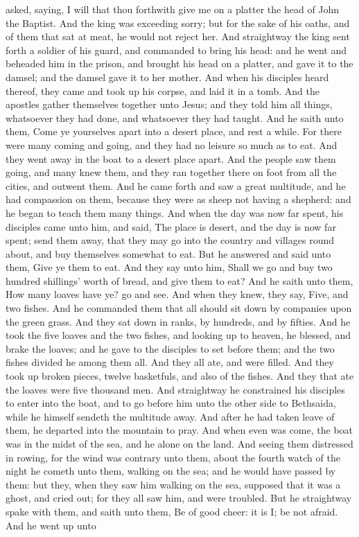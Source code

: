 asked, saying, I will that thou forthwith give me on a platter the head of John the Baptist. And the king was exceeding sorry; but for the sake of his oaths, and of them that sat at meat, he would not reject her. And straightway the king sent forth a soldier of his guard, and commanded to bring his head: and he went and beheaded him in the prison, and brought his head on a platter, and gave it to the damsel; and the damsel gave it to her mother. And when his disciples heard thereof, they came and took up his corpse, and laid it in a tomb.  And the apostles gather themselves together unto Jesus; and they told him all things, whatsoever they had done, and whatsoever they had taught. And he saith unto them, Come ye yourselves apart into a desert place, and rest a while. For there were many coming and going, and they had no leisure so much as to eat. And they went away in the boat to a desert place apart. And the people saw them going, and many knew them, and they ran together there on foot from all the cities, and outwent them. And he came forth and saw a great multitude, and he had compassion on them, because they were as sheep not having a shepherd: and he began to teach them many things. And when the day was now far spent, his disciples came unto him, and said, The place is desert, and the day is now far spent; send them away, that they may go into the country and villages round about, and buy themselves somewhat to eat. But he answered and said unto them, Give ye them to eat. And they say unto him, Shall we go and buy two hundred shillings’ worth of bread, and give them to eat? And he saith unto them, How many loaves have ye? go and see. And when they knew, they say, Five, and two fishes. And he commanded them that all should sit down by companies upon the green grass. And they sat down in ranks, by hundreds, and by fifties. And he took the five loaves and the two fishes, and looking up to heaven, he blessed, and brake the loaves; and he gave to the disciples to set before them; and the two fishes divided he among them all. And they all ate, and were filled. And they took up broken pieces, twelve basketfuls, and also of the fishes. And they that ate the loaves were five thousand men.  And straightway he constrained his disciples to enter into the boat, and to go before him unto the other side to Bethsaida, while he himself sendeth the multitude away. And after he had taken leave of them, he departed into the mountain to pray. And when even was come, the boat was in the midst of the sea, and he alone on the land. And seeing them distressed in rowing, for the wind was contrary unto them, about the fourth watch of the night he cometh unto them, walking on the sea; and he would have passed by them: but they, when they saw him walking on the sea, supposed that it was a ghost, and cried out; for they all saw him, and were troubled. But he straightway spake with them, and saith unto them, Be of good cheer: it is I; be not afraid. And he went up unto 